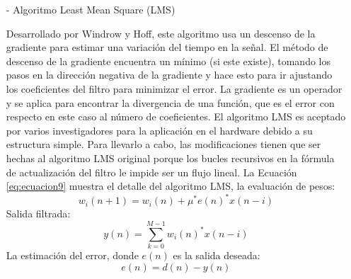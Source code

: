 \begin{enumerate}
\begin{enumerate}
\begin{enumerate}
\item[-]Algoritmo Least Mean Square (LMS)
\par
Desarrollado por Windrow y Hoff, este algoritmo usa un descenso de la gradiente para estimar una variación del tiempo en la señal. El método de descenso de la gradiente encuentra un mínimo (si este existe), tomando los pasos en la dirección negativa de la gradiente y hace esto para ir ajustando los coeficientes del filtro para minimizar el error. La gradiente es un operador y se aplica para encontrar la divergencia de una función, que es el error con respecto en este caso al número de coeficientes. 
\vskip 0.5cm
El algoritmo LMS es aceptado por varios investigadores para la aplicación en el hardware debido a su estructura simple. Para llevarlo a cabo, las modificaciones tienen que ser hechas al algoritmo LMS original porque los bucles recursivos en la fórmula de actualización del filtro le impide ser un flujo lineal.
\vskip 0.5cm
La Ecuación \ref{eq:ecuacion9} muestra el detalle del algoritmo LMS, la evaluación de pesos:
\begin{equation}
\label{eq:ecuacion9}
w_{i}(n+1) = w_{i}(n) + \mu^{*}e(n)^{*}x(n-i)
\end{equation}
\vskip -0.5cm
Salida filtrada:
\vskip -0.5cm
\begin{equation}
\label{eq:ecuacion10}
y(n) = \sum_{k=0}^{M-1}w_{i}(n)^{*}x(n-i)
\end{equation}
\vskip 0.5cm
La estimación del error, donde $e(n)$ es la salida deseada:
\vskip -1cm
\begin{equation}
\label{eq:ecuacion11}
e(n) = d(n) - y(n)
\end{equation}


\end{enumerate}
\end{enumerate}
\end{enumerate}
